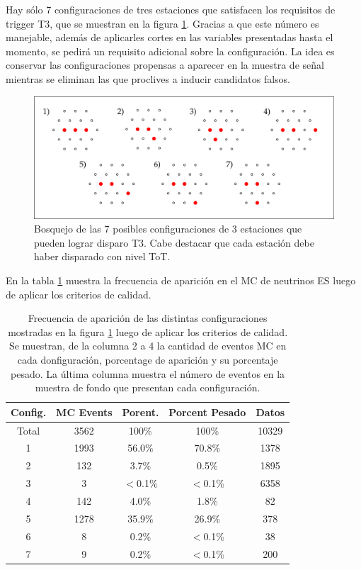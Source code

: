 		Hay sólo 7 configuraciones de tres estaciones que  satisfacen los requisitos de trigger T3, que se muestran en la figura \ref{fig:3stConf}.
		Gracias a que este número es manejable, además de aplicarles cortes en las variables presentadas hasta el momento, se pedirá un requisito adicional sobre la configuración.
		La idea es conservar las configuraciones propensas a aparecer en la muestra de señal mientras se eliminan las que proclives a inducir candidatos falsos.
		\begin{figure}[ht!]
		\begin{center}
		\includegraphics[width=1.0\textwidth]{fig/seleccionAuger/3stConf}
		\caption{Bosquejo de las 7 posibles configuraciones de 3 estaciones que pueden lograr disparo T3. Cabe destacar que cada estación debe haber disparado con nivel ToT.}
		\label{fig:3stConf}
		\end{center}
		\end{figure}
		En la tabla \ref{tab:3stConf} muestra la frecuencia de aparición en el MC de neutrinos ES luego de aplicar los criterios de calidad.
		\begin{table}[!h]
		\centering
		\begin{tabular}{|c|c|c|c|c|}
		\hline
		Config. & MC Events & Porent. & Porcent Pesado & Datos                  \\
		\hline
		Total & 3562 & 100\% & 100\%& 10329\\
		\hline
		1 & 1993 & 56.0\% & 70.8\% & 1378\\
		2 & 132 & 3.7\% & 0.5\% & 1895\\
		3 & 3 & $<$0.1\% & $<$0.1\% & 6358\\
		4 & 142 & 4.0\% & 1.8\% & 82\\
		5 & 1278 & 35.9\% & 26.9\% & 378\\
		6 & 8 & 0.2\% & $<$0.1\% & 38\\
		7 & 9 & 0.2\% & $<$0.1\% & 200\\
		\hline
		\end{tabular}
		\caption{
		\label{tab:3stConf}
		Frecuencia de aparición de las distintas configuraciones mostradas en la figura \ref{fig:3stConf} luego de aplicar los criterios de calidad.
		Se muestran, de la columna 2 a 4 la cantidad de eventos MC en cada donfiguración, porcentage de aparición y su porcentaje pesado.
		La última columna muestra el número de eventos en la muestra de fondo que presentan cada configuración.
		}
		\end{table}
